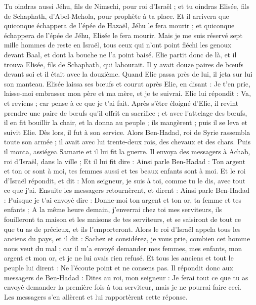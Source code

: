 \begin{multicols}{2}
Tu oindras aussi Jéhu, fils de Nimschi, pour roi d’Israël ; et tu oindras Elisée, fils de Schaphath, d'Abel-Mehola, pour prophète à ta place.
Et il arrivera que quiconque échappera de l'épée de Hazaël, Jéhu le fera mourir ; et quiconque échappera de l'épée de Jéhu, Elisée le fera mourir.
Mais je me suis réservé sept mille hommes de reste en Israël, tous ceux qui n'ont point fléchi les genoux devant Baal, et dont la bouche ne l'a point baisé.
Elie partit donc de là, et il trouva Elisée, fils de Schaphath, qui labourait. Il y avait douze paires de bœufs devant soi et il était avec la douzième. Quand Elie passa près de lui, il jeta sur lui son manteau.
Elisée laissa ses bœufs et courut après Elie, en disant : Je t’en prie, laisse-moi embrasser mon père et ma mère, et je te suivrai. Elie lui répondit : Va, et reviens ; car pense à ce que je t'ai fait.
Après s’être éloigné d’Elie, il revint prendre une paire de bœufs qu’il offrit en sacrifice ; et avec l'attelage des bœufs, il en fit bouillir la chair, et la donna au peuple ; ils mangèrent ; puis il se leva et suivit Elie. Dès lors, il fut à son service.
\VerseOne{}Alors Ben-Hadad, roi de Syrie rassembla toute son armée ; il avait avec lui trente-deux rois, des chevaux et des chars. Puis il monta, assiégea Samarie et il lui fit la guerre.
Il envoya des messagers à Achab, roi d'Israël, dans la ville ;
Et il lui fit dire : Ainsi parle Ben-Hadad : Ton argent et ton or sont à moi, tes femmes aussi et tes beaux enfants sont à moi.
Et le roi d'Israël répondit, et dit : Mon seigneur, je suis à toi, comme tu le dis, avec tout ce que j'ai.
Ensuite les messagers retournèrent, et dirent : Ainsi parle Ben-Hadad : Puisque je t'ai envoyé dire : Donne-moi ton argent et ton or, ta femme et tes enfants ;
A la même heure demain, j'enverrai chez toi mes serviteurs, ils fouilleront ta maison et les maisons de tes serviteurs, et se saisiront de tout ce que tu as de précieux, et ils l'emporteront.
Alors le roi d'Israël appela tous les anciens du pays, et il dit : Sachez et considérez, je vous prie, combien cet homme nous veut du mal ; car il m’a envoyé demander mes femmes, mes enfants, mon argent et mon or, et je ne lui avais rien refusé.
Et tous les anciens et tout le peuple lui dirent : Ne l'écoute point et ne consens pas.
Il répondit donc aux messagers de Ben-Hadad : Dites au roi, mon seigneur : Je ferai tout ce que tu as envoyé demander la première fois à ton serviteur, mais je ne pourrai faire ceci. Les messagers s'en allèrent et lui rapportèrent cette réponse.

\end{multicols}
